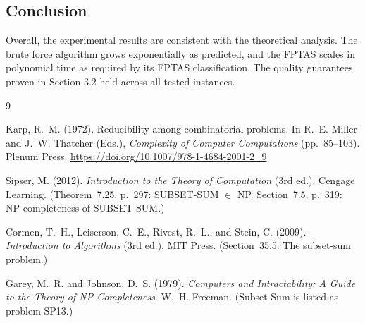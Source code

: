 \documentclass[12pt,a4paper]{article}
\theoremstyle{definition}
\begin{document}
\subsection{Conclusion}

Overall, the experimental results are consistent with the theoretical analysis. The brute force algorithm grows exponentially as predicted, and the FPTAS scales in polynomial time as required by its FPTAS classification. The quality guarantees proven in Section 3.2 held across all tested instances.


\newpage
\begin{thebibliography}{9}

  Karp, R.~M. (1972).
  Reducibility among combinatorial problems.
  In R.~E. Miller and J.~W. Thatcher (Eds.),
  \textit{Complexity of Computer Computations} (pp.~85--103). Plenum Press.
  \url{https://doi.org/10.1007/978-1-4684-2001-2_9}

  Sipser, M. (2012).
  \textit{Introduction to the Theory of Computation} (3rd ed.).
  Cengage Learning.
  (Theorem~7.25, p.~297: SUBSET-SUM $\in$ NP.
   Section~7.5, p.~319: NP-completeness of SUBSET-SUM.)

  Cormen, T.~H., Leiserson, C.~E., Rivest, R.~L., and Stein, C. (2009).
  \textit{Introduction to Algorithms} (3rd ed.). MIT Press.
  (Section~35.5: The subset-sum problem.)

  Garey, M.~R. and Johnson, D.~S. (1979).
  \textit{Computers and Intractability: A Guide to the Theory of
  NP-Completeness}. W.~H. Freeman.
  (Subset Sum is listed as problem SP13.)

\end{thebibliography}
\end{document}
